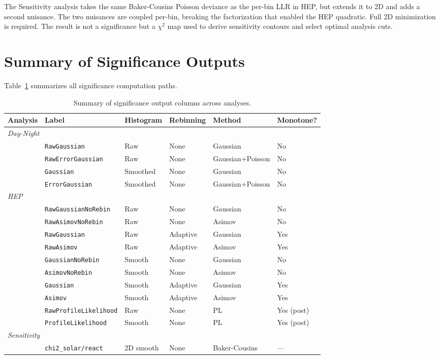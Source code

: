 \documentclass[12pt,a4paper]{article}
\begin{document}
The Sensitivity analysis takes the same Baker-Cousins Poisson deviance
as the per-bin LLR in HEP, but extends it to 2D and adds a second nuisance.
The two nuisances are coupled per-bin, breaking the factorization that
enabled the HEP quadratic.  Full 2D minimization is required.
The result is not a significance but a $\chi^2$ map used to derive
sensitivity contours and select optimal analysis cuts.

\section{Summary of Significance Outputs}
\label{sec:summary}

Table~\ref{tab:methods} summarizes all significance computation paths.

\begin{table}[ht]
\centering
\caption{Summary of significance output columns across analyses.}
\label{tab:methods}
\begin{tabular}{llllll}
\toprule
Analysis & Label & Histogram & Rebinning & Method & Monotone? \\
\midrule
\multicolumn{6}{l}{\textit{Day-Night}} \\
 & \texttt{RawGaussian}       & Raw     & None & Gaussian         & No \\
 & \texttt{RawErrorGaussian}  & Raw     & None & Gaussian+Poisson & No \\
 & \texttt{Gaussian}          & Smoothed & None & Gaussian        & No \\
 & \texttt{ErrorGaussian}     & Smoothed & None & Gaussian+Poisson & No \\
\midrule
\multicolumn{6}{l}{\textit{HEP}} \\
 & \texttt{RawGaussianNoRebin}    & Raw    & None    & Gaussian & No \\
 & \texttt{RawAsimovNoRebin}      & Raw    & None    & Asimov   & No \\
 & \texttt{RawGaussian}           & Raw    & Adaptive & Gaussian & Yes \\
 & \texttt{RawAsimov}             & Raw    & Adaptive & Asimov   & Yes \\
 & \texttt{GaussianNoRebin}       & Smooth & None    & Gaussian & No \\
 & \texttt{AsimovNoRebin}         & Smooth & None    & Asimov   & No \\
 & \texttt{Gaussian}              & Smooth & Adaptive & Gaussian & Yes \\
 & \texttt{Asimov}                & Smooth & Adaptive & Asimov   & Yes \\
 & \texttt{RawProfileLikelihood}  & Raw    & None    & PL       & Yes (post) \\
 & \texttt{ProfileLikelihood}     & Smooth & None    & PL       & Yes (post) \\
\midrule
\multicolumn{6}{l}{\textit{Sensitivity}} \\
 & \texttt{chi2\_solar/react} & 2D smooth & None & Baker-Cousins & --- \\
\bottomrule
\end{tabular}
\end{table}
\end{document}
